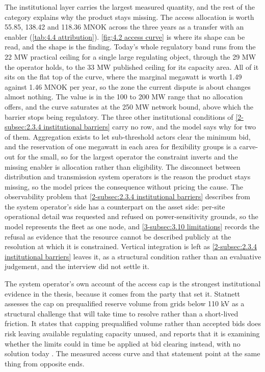 The institutional layer carries the largest measured quantity, and the rest of the category explains why the product stays missing. The access allocation is worth 55.85, 138.42 and 118.36 MNOK across the three years as a transfer with an enabler (\autoref{tab:4.4 attribution}). \autoref{fig:4.2 access curve} is where its shape can be read, and the shape is the finding. Today's whole regulatory band runs from the 22 MW practical ceiling for a single large regulating object, through the 29 MW the operator holds, to the 33 MW published ceiling for its capacity area. All of it sits on the flat top of the curve, where the marginal megawatt is worth 1.49 against 1.46 MNOK per year, so the zone the current dispute is about changes almost nothing. The value is in the 100 to 200 MW range that no allocation offers, and the curve saturates at the 250 MW network bound, above which the barrier stops being regulatory. The three other institutional conditions of \autoref{2-subsec:2.3.4 institutional barriers} carry no row, and the model says why for two of them. Aggregation exists to let sub-threshold actors clear the minimum bid, and the reservation of one megawatt in each area for flexibility groups is a carve-out for the small, so for the largest operator the constraint inverts and the missing enabler is allocation rather than eligibility. The disconnect between distribution and transmission system operators is the reason the product stays missing, so the model prices the consequence without pricing the cause. The observability problem that \autoref{2-subsec:2.3.4 institutional barriers} describes from the system operator's side has a counterpart on the asset side: per-site operational detail was requested and refused on power-sensitivity grounds, so the model represents the fleet as one node, and \autoref{3-subsec:3.10 limitations} records the refusal as evidence that the resource cannot be described publicly at the resolution at which it is constrained. Vertical integration is left as \autoref{2-subsec:2.3.4 institutional barriers} leaves it, as a structural condition rather than an evaluative judgement, and the interview did not settle it.

The system operator's own account of the access cap is the strongest institutional evidence in the thesis, because it comes from the party that set it. Statnett assesses the cap on prequalified reserve volume from grids below 110 kV as a structural challenge that will take time to resolve rather than a short-lived friction. It states that capping prequalified volume rather than accepted bids does risk leaving available regulating capacity unused, and reports that it is examining whether the limits could in time be applied at bid clearing instead, with no solution today \cite{statnett_sporsmal_2026}. The measured access curve and that statement point at the same thing from opposite ends.

